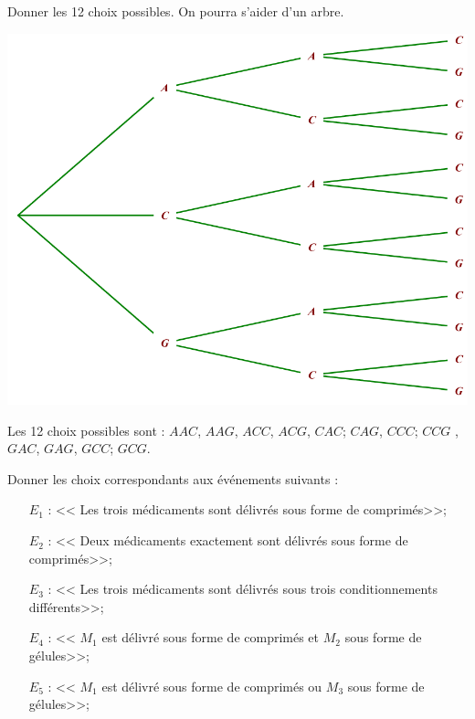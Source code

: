\subsection{}
\begin{questions}
	\question[2] Donner les 12 choix possibles. On pourra s'aider d'un arbre.
	\begin{solution}
		\includegraphics[scale=0.5]{arbre}
		
		Les 12 choix possibles sont : $AAC$, $AAG$, $ACC$, $ACG$, $CAC$; $CAG$, $CCC$; $CCG$ , $GAC$, $GAG$, $GCC$; $GCG$.
	\end{solution}
	
	\question[5] Donner les choix correspondants aux événements suivants :
	
	\begin{itemize}
		\item[$E_1$ :]  << Les trois médicaments sont délivrés sous forme de comprimés>>;
		\item[$E_2$ :] << Deux médicaments exactement sont délivrés sous forme de comprimés>>;
		\item[$E_3$ :] << Les trois médicaments sont délivrés sous trois conditionnements différents>>;
		\item[$E_4$ :] << $M_1$ est délivré sous forme de comprimés et $M_2$ sous forme de gélules>>;
		\item[$E_5$ :] << $M_1$ est délivré sous forme de comprimés ou $M_3$ sous forme de gélules>>;
	\end{itemize}


\end{questions}
